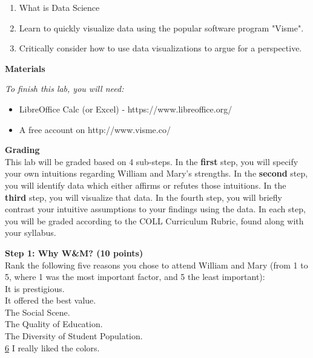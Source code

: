\documentclass{article}
\begin{document}
\begin{enumerate}[leftmargin=15mm]

\item What is Data Science
\item Learn to quickly visualize data using the popular software program "Visme". 
\item Critically consider how to use data visualizations to argue for a perspective.

\end{enumerate}

\vspace{3mm}
\textbf{Materials}

\textit{To finish this lab, you will need:}
\begin{itemize}
\item LibreOffice Calc (or Excel) - https://www.libreoffice.org/
\item A free account on http://www.visme.co/
\end{itemize}

\vspace{3mm}
\textbf{Grading}\\
This lab will be graded based on 4 sub-steps.  In the \textbf{first} step, you will specify your own intuitions regarding William and Mary's strengths.  In the \textbf{second} step, you will identify data which either affirms or refutes those intuitions.  In the \textbf{third} step, you will visualize that data.  In the fourth step, you will briefly contrast your intuitive assumptions to your findings using the data.  In each step, you will be graded according to the COLL Curriculum Rubric, found along with your syllabus.

\vspace{3mm}
\textbf{Step 1: Why W\&M? (10 points)}\\
Rank the following five reasons you chose to attend William and Mary (from 1 to 5, where 1 was the most important factor, and 5 the least important):\\
\underline{\hspace{0.35cm}} It is prestigious.\\
\underline{\hspace{0.35cm}} It offered the best value.\\
\underline{\hspace{0.35cm}} The Social Scene. \\
\underline{\hspace{0.35cm}} The Quality of Education. \\
\underline{\hspace{0.35cm}} The Diversity of Student Population.\\
\underline{\hspace{0.05cm}}\underline{6}\underline{\hspace{0.1cm}}  I really liked the colors.\\
\end{document}
